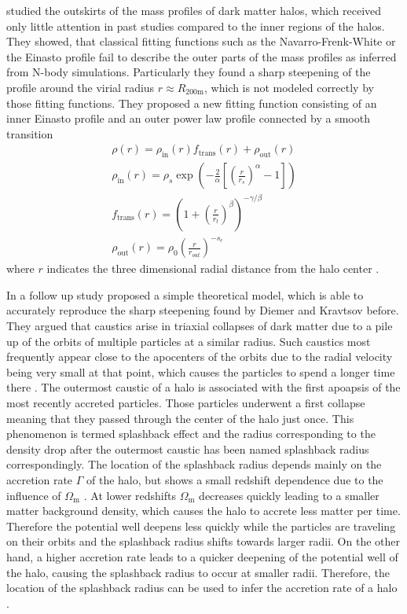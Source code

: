 \documentclass[a4paper,fleqn,usenatbib]{mnras}
\begin{document}
\citet{diemer2014dependence} studied the outskirts of the mass profiles of dark matter halos, which received only little attention in past studies compared to the inner regions of the halos. They showed, that classical fitting functions such as the Navarro-Frenk-White or the Einasto profile fail to describe the outer parts of the mass profiles as inferred from N-body simulations. Particularly they found a sharp steepening of the profile around the virial radius $r \approx R_{\mathrm{200m}}$, which is not modeled correctly by those fitting functions. They proposed a new fitting function consisting of an inner Einasto profile and an outer power law profile connected by a smooth transition
\begin{align}
\rho(r)=\rho_{\mathrm{in}}(r)f_{\mathrm{trans}}(r) + \rho_{\mathrm{out}}(r) 
\label{eq:model} \\
\rho_{\mathrm{in}}(r)=\rho_s\exp\left( -\frac{2}{\alpha}\left[ \left( \frac{r}{r_s}\right)^{\alpha}-1 \right] \right) \\
f_{\mathrm{trans}}(r)=\left( 1+\left( \frac{r}{r_t} \right)^{\beta} \right)^{-\gamma/ \beta} \\
\rho_{\mathrm{out}}(r)=\rho_0\left( \frac{r}{r_{out}}\right)^{-s_e}
\end{align}
where $r$ indicates the three dimensional radial distance from the halo center \citep{diemer2014dependence}.

In a follow up study \citet{adhikari2014splashback} proposed a simple theoretical model, which is able to accurately reproduce the sharp steepening found by Diemer and Kravtsov before. They argued that caustics arise in triaxial collapses of dark matter due to a pile up of the orbits of multiple particles at a similar radius. Such caustics most frequently appear close to the apocenters of the orbits due to the radial velocity being very small at that point, which causes the particles to spend a longer time there \citep{lithwick2011self}. The outermost caustic of a halo is associated with the first apoapsis of the most recently accreted particles. Those particles underwent a first collapse meaning that they passed through the center of the halo just once. This phenomenon is termed splashback effect and the radius corresponding to the density drop after the outermost caustic has been named splashback radius correspondingly. The location of the splashback radius depends mainly on the accretion rate $\Gamma$ of the halo, but shows a small redshift dependence due to the influence of $\Omega_{\mathrm{m}}$ . At lower redshifts $\Omega_{\mathrm{m}}$ decreases quickly leading to a smaller matter background density, which causes the halo to accrete less matter per time. Therefore the potential well deepens less quickly while the particles are traveling on their orbits and the splashback radius shifts towards larger radii. On the other hand, a higher accretion rate leads to a quicker deepening of the potential well of the halo, causing the splashback radius to occur at smaller radii. Therefore, the location of the splashback radius can be used to infer the accretion rate of a halo \citep{adhikari2014splashback}.
\end{document}
